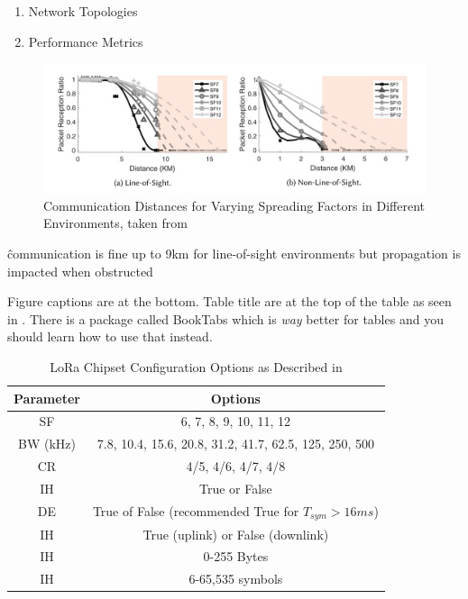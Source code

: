 \documentclass[a4paper,twoside,12pt]{report}
\begin{document}
\begin{enumerate}
    \item Network Topologies
    \item Performance Metrics
\end{enumerate}

\begin{figure}[ht]
	\centering
	\includegraphics[width=0.8\linewidth]{images/LoRa_propagation_line_of_sight.png}
	\caption{Communication Distances for Varying Spreading Factors in Different Environments, taken from \cite{Liando2019KnownStudy}}
	\label{fig:LoRaTransmissionSpectogram}
\end{figure}

\^ communication is fine up to 9km for line-of-sight environments but propagation is impacted when obstructed


Figure captions are at the bottom. Table title are at the top of the table as seen in . There is a package called BookTabs which is \textit{way} better for tables and you should learn how to use that instead.

\begin{table}[p]
	\centering
	\caption{LoRa Chipset Configuration Options as Described in \cite{SemtechDatasheet}}
	\label{tab:tab1}
\begin{tabular}{cc}
	\hline
	Parameter & Options\\
	\hline\hline 
	SF & 6, 7, 8, 9, 10, 11, 12 \\ 
	BW (kHz) & 7.8, 10.4, 15.6, 20.8, 31.2, 41.7, 62.5, 125, 250, 500 \\ 
    CR & 4/5, 4/6, 4/7, 4/8 \\ 
    IH & True or False \\ 
    DE & True of False (recommended True for $T_{sym} > 16ms$) \\ 
    IH & True (uplink) or False (downlink) \\ 
    IH & 0-255 Bytes \\ 
    IH & 6-65,535 symbols \\ 
	\hline
\end{tabular} 
\end{table}
\end{document}
